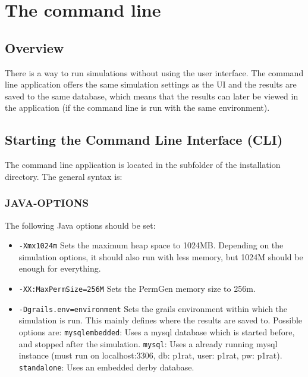 \chapter{The command line}
\label{chap:cli}

\section{Overview}
There is a way to run simulations without using the user interface. The command line application offers the same simulation settings as the UI and the results are saved to the same database, which means that the results
can later be viewed in the application (if the command line is run with the same environment).

\section{Starting the Command Line Interface (CLI)}
\label{sec:cli_start}

The command line application is located in the  subfolder of the
installation directory. The general syntax is:

\subsection{JAVA-OPTIONS}

The following Java options should be set:

\begin{itemize}
	\item \texttt{-Xmx1024m} Sets the maximum heap space to 1024MB. Depending on the simulation options, it should also run with less memory, but 1024M should be enough for everything.
	\item \texttt{-XX:MaxPermSize=256M} Sets the PermGen memory size to 256m.
	\item \texttt{-Dgrails.env=environment} Sets the grails environment within which the simulation is run. This mainly defines where the results are saved to.
		Possible options are: \texttt{mysqlembedded}: Uses a mysql database which is started before, and stopped after the simulation. \texttt{mysql}: Uses a already running mysql instance (must run on localhost:3306, db: p1rat, user: p1rat, pw: p1rat). \texttt{standalone}: Uses an embedded derby database.
\end{itemize}

